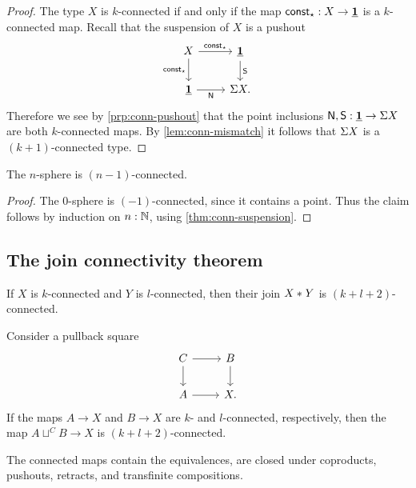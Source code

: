 \begin{proof}
  The type $X$ is $k$-connected if and only if the map $\mathsf{const}_\star:X\to\underline{\mathbf{1}}$ is a $k$-connected map. Recall that the suspension of $X$ is a pushout
  \begin{equation*}
    \begin{tikzcd}
      X \arrow[d,swap,"\const_\ttt"] \arrow[r,"\const_\ttt"] & \unit \arrow[d,"\south"] \\
      \unit \arrow[r,swap,"\north"] & \susp X.
    \end{tikzcd}
  \end{equation*}
  Therefore we see by \cref{prp:conn-pushout} that the point inclusions $\mathsf{N},\mathsf{S}:\underline{\mathbf{1}}\to\Sigma X$ are both $k$-connected maps. By \cref{lem:conn-mismatch} it follows that $\Sigma X$ is a $(k+1)$-connected type.
\end{proof}

\begin{cor}\label{cor:conn-sphere}
  The $n$-sphere is $(n-1)$-connected.
\end{cor}

\begin{proof}
  The $0$-sphere is $(-1)$-connected, since it contains a point. Thus the claim follows by induction on $n:{\mathbb{N}}$, using \cref{thm:conn-suspension}.
\end{proof}

\subsection{The join connectivity theorem}

\begin{thm}
  If $X$ is $k$-connected and $Y$ is $l$-connected, then their join ${X}\ast_{}{Y}$ is $(k+l+2)$-connected.
\end{thm}

\begin{thm}
Consider a pullback square
\begin{equation*}
\begin{tikzcd}
C \arrow[r] \arrow[d] & B \arrow[d] \\
A \arrow[r] & X.
\end{tikzcd}
\end{equation*}
If the maps $A\to X$ and $B\to X$ are $k$- and $l$-connected, respectively, then the map $A\sqcup^C B\to X$ is $(k+l+2)$-connected.
\end{thm}

\begin{thm}
  The connected maps contain the equivalences, are closed under coproducts, pushouts, retracts, and transfinite compositions.
\end{thm}

